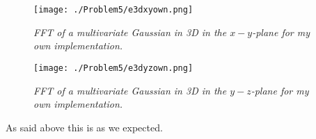 \begin{figure}[H]
  \centering
  \texttt{[image: ./Problem5/e3dxyown.png]}
  \caption{\textit{FFT of a multivariate Gaussian in 3D in the $x-y$-plane for my own implementation.}}
\end{figure}

\begin{figure}[H]
  \centering
  \texttt{[image: ./Problem5/e3dyzown.png]}
  \caption{\textit{FFT of a multivariate Gaussian in 3D in the $y-z$-plane for my own implementation.}}
\end{figure}

As said above this is as we expected.

